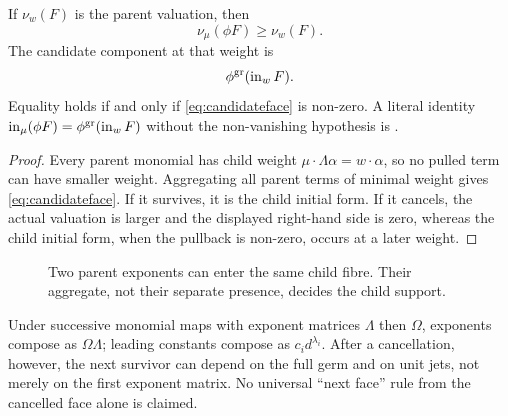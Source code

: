 \begin{theorem}\label{thm:pullbackface}
If \(\nu_w(F)\) is the parent valuation, then
\[
\nu_\mu(\phi F)\ge\nu_w(F).
\]
The candidate component at that weight is
\begin{equation}\label{eq:candidateface}
\phi^{\rm gr}(\operatorname{in}_w F).
\end{equation}
Equality holds if and only if \cref{eq:candidateface} is non-zero.  A literal
identity \(\operatorname{in}_\mu(\phi F)=\phi^{\rm gr}(\operatorname{in}_wF)\) without the non-vanishing
hypothesis is .
\end{theorem}
\begin{proof}
Every parent monomial has child weight
\(\mu\cdot\Lambda\alpha=w\cdot\alpha\), so no pulled term can have smaller
weight.  Aggregating all parent terms of minimal weight gives
\cref{eq:candidateface}.  If it survives, it is the child initial form.  If it
cancels, the actual valuation is larger and the displayed right-hand side is
zero, whereas the child initial form, when the pullback is non-zero, occurs at a
later weight.
\end{proof}

\begin{figure}[ht]
\centering
\caption{Two parent exponents can enter the same child fibre.  Their aggregate,
not their separate presence, decides the child support.}
\label{fig:pullback}
\end{figure}

Under successive monomial maps with exponent matrices \(\Lambda\) then
\(\Omega\), exponents compose as \(\Omega\Lambda\); leading constants compose
as \(c_i d^{\lambda_i}\).  After a cancellation, however, the next survivor can
depend on the full germ and on unit jets, not merely on the first exponent
matrix.  No universal ``next face'' rule from the cancelled face alone is
claimed.
